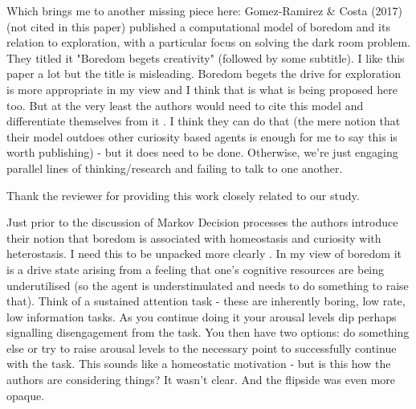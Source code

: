 \documentclass[utf8]{article}
\newenvironment{reply}  
    {\color{Blue}\noindent\newline}
    {\newline}
\begin{document}
        
        
        Which brings me to another missing piece here: Gomez-Ramirez \& Costa  (2017) (not cited in this paper) published a computational model of boredom and its relation to exploration, with a particular focus on solving the dark room problem. They titled it "Boredom begets creativity" (followed by some subtitle). I like this paper a lot but the title is misleading. Boredom begets the drive for exploration is more appropriate in my view and I think that is what is being proposed here too. But at the very least the authors would need to cite this model and differentiate themselves from it . I think they can do that (the mere notion that their model outdoes other curiosity based agents is enough for me to say this is worth publishing) - but it does need to be done. Otherwise, we're just engaging parallel lines of thinking/research and failing to talk to one another. 
        
        \begin{reply}
            Thank the reviewer for providing this work closely related to our study.
            \newline
        \end{reply}
        
        Just prior to the discussion of Markov Decision processes the authors introduce their notion that boredom is associated with homeostasis and curiosity with heterostasis. I need this to be unpacked more clearly . In my view of boredom it is a drive state arising from a feeling that one's cognitive resources are being underutilised (so the agent is understimulated and needs to do something to raise that). Think of a sustained attention task - these are inherently boring, low rate, low information tasks. As you continue doing it your arousal levels dip perhaps signalling disengagement from the task. You then have two options: do something else or try to raise arousal levels to the necessary point to successfully continue with the task. This sounds like a homeostatic motivation - but is this how the authors are considering things? It wasn't clear. And the flipside was even more opaque. 
        
\end{document}
